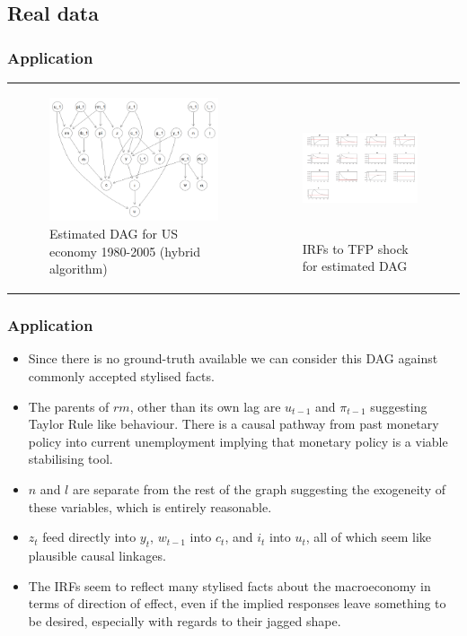 \documentclass{beamer}
\begin{document}
\subsection{Real data}
\begin{frame}
    \frametitle{Application}
    \begin{tabular}{ p{5cm} p{5cm} }
        \begin{figure}
            \centering
            \includegraphics[width=5cm]{images/real_hybrid_structure.png}
            \caption{Estimated DAG for US economy 1980-2005 (hybrid algorithm)}
            \label{dag11}
          \end{figure}
        &
        \begin{figure}
            \centering
            \includegraphics[width=5cm,height=4cm]{images/real_z_irf.png}
            \caption{IRFs to TFP shock for estimated DAG}
            \label{dag12}
          \end{figure}
    \end{tabular}
\end{frame}

\begin{frame}
    \frametitle{Application}
    \begin{itemize}
        \item Since there is no ground-truth available we can consider this DAG against commonly accepted stylised facts.
        \item The parents of $rm$, other than its own lag are $u_{t-1}$ and $\pi_{t-1}$ suggesting Taylor Rule like behaviour. There is a causal pathway from past monetary policy into current unemployment implying that monetary policy is a viable stabilising tool. 
        \item $n$ and $l$ are separate from the rest of the graph suggesting the exogeneity of these variables, which is entirely reasonable. 
        \item $z_t$ feed directly into $y_t$, $w_{t-1}$ into $c_t$, and $i_t$ into $u_t$, all of which seem like plausible causal linkages.
        \item The IRFs seem to reflect many stylised facts about the macroeconomy in terms of direction of effect, even if the implied responses leave something to be desired, especially with regards to their jagged shape. 
    \end{itemize}
\end{frame}
\end{document}
